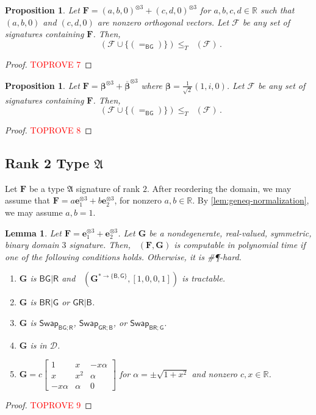 \documentclass[11pt]{article}
\newtheorem{lemma}[theorem]{Lemma}
\newtheorem{proposition}[theorem]{Proposition}
\DeclareMathOperator{\holbs}{Holant^*_2}
\DeclareMathOperator{\holts}{Holant^*_3}
\newcommand{\db}{\mathsf{B}}
\newcommand{\dg}{\mathsf{G}}
\newcommand{\dr}{\mathsf{R}}
\newcommand{\swhelper}[1]{$\mathsf{Swap}_{#1}$\xspace}
\newcommand{\swbg}{\swhelper{\db \dg; \dr}}
\newcommand{\swbr}{\swhelper{\db \dr; \dg}}
\newcommand{\swgr}{\swhelper{\dg \dr; \db}}
\newcommand{\sph}{\#\P-hard\xspace}
\newcommand{\teh}{^{\otimes 3}}
\newcommand{\domres}[1]{
  ^{*\to\{#1\}}
}
\newcommand{\bdgr}{\dg \dr | \db}
\newcommand{\ternarytractgeneq}{$\mathfrak{A}$\xspace}
\begin{document}
\begin{proposition}\label{lem:geneq-eqbg}
  Let $\mathbf{F} =  (a, b, 0)\teh + (c, d, 0)\teh$ for $a, b, c, d \in \mathbb{R}$ such that $(a, b, 0)$ and $(c, d, 0)$ are nonzero orthogonal vectors.
  Let $\mathcal{F}$ be any set of signatures containing $\mathbf{F}$.
  Then, 
  \[
    \holts(\mathcal{F} \cup \{(=_{\db \dg})\}) \le_T \holts(\mathcal{F}) \, .
  \]
\end{proposition}
\begin{proof}\textcolor{red}{TOPROVE 7}\end{proof}

\begin{proposition}\label{lem:z-eqbg}
  Let $\mathbf{F} = \boldsymbol{\beta} \teh + \overline{\boldsymbol{\beta}} \teh$ where $\boldsymbol{\beta} = \frac{1}{\sqrt{2}} (1, i, 0)$.
  Let $\mathcal{F}$ be any set of signatures containing $\mathbf{F}$.
  Then, 
  \[
    \holts(\mathcal{F} \cup \{(=_{\db \dg})\}) \le_T \holts(\mathcal{F}) \, .
  \]
\end{proposition}
\begin{proof}\textcolor{red}{TOPROVE 8}\end{proof}


\subsection{Rank 2 Type \texorpdfstring{\ternarytractgeneq}{A}}
Let $\mathbf{F}$ be a type \ternarytractgeneq signature of rank $2$.
After reordering the domain, we may assume that $\mathbf{F} = a \mathbf{e}_1 \teh + b \mathbf{e}_2 \teh$, for nonzero $a, b \in \mathbb{R}$.
By \cref{lem:geneq-normalization}, we may assume $a, b = 1$.

\begin{lemma}\label{lem:dichotomy-single-ternary-rank-2-geneq-single-binary}
  Let $\mathbf{F} = \mathbf{e}_1 \teh + \mathbf{e}_2 \teh$.
  Let $\mathbf{G}$ be a nondegenerate, real-valued, symmetric, binary domain $3$ signature.
  Then, $\holts(\mathbf{F}, \mathbf{G})$ is computable in polynomial time if one of the following conditions holds. Otherwise, it is \sph.
  \begin{enumerate}
    \item $\mathbf{G}$ is $\db \dg | \dr$ and $\holbs(\mathbf{G}\domres{\db, \dg}, [1, 0, 0, 1])$ is tractable.
    \item $\mathbf{G}$ is $\db \dr | \dg$ or $\bdgr$.
    \item $\mathbf{G}$ is \swbg, \swgr, or \swbr.
    \item $\mathbf{G}$ is in $\mathcal{D}$.
    \item $\mathbf{G} = c \begin{bmatrix}
        1 & x & -x \alpha \\
        x & x^2 & \alpha \\
        -x \alpha & \alpha & 0
      \end{bmatrix}$ for $\alpha = \pm \sqrt{1 + x^2}$ and nonzero $c, x \in \mathbb{R}$.
  \end{enumerate}
\end{lemma}
\begin{proof}\textcolor{red}{TOPROVE 9}\end{proof}
\end{document}
